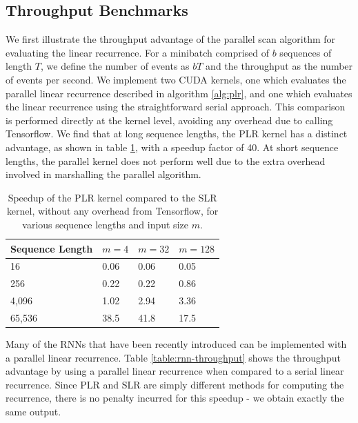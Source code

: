 \documentclass{article}
\begin{document}
\subsection{Throughput Benchmarks}
We first illustrate the throughput advantage of the parallel scan algorithm for
evaluating the linear recurrence. For a minibatch comprised of \(b\) sequences
of length \(T\), we define the number of events as \(bT\) and the throughput as
the number of events per second. We implement two CUDA kernels, one which
evaluates the parallel linear recurrence described in algorithm \ref{alg:plr},
and one which evaluates the linear recurrence using the straightforward serial
approach. This comparison is performed directly at the kernel level, avoiding
any overhead due to calling Tensorflow. We find that at long sequence lengths,
the PLR kernel has a distinct advantage, as shown in table
\ref{table:kernel-throughput}, with a speedup factor of 40. At short sequence
lengths, the parallel kernel does not perform well due to the extra overhead
involved in marshalling the parallel algorithm. 
\begin{table}[]
  \centering
\caption{Speedup of the PLR kernel compared to the SLR kernel, without any
  overhead from Tensorflow, for various sequence lengths and input size \(m\).}      
\label{table:kernel-throughput}
\begin{tabular}{@{}llll@{}}
Sequence Length & \(m=4\)  & \(m=32\) & \(m=128\) \\ \midrule
16              & 0.06 & 0.06 & 0.05  \\
256             & 0.22 & 0.22 & 0.86  \\
4,096           & 1.02 & 2.94 & 3.36  \\
65,536          & 38.5 & 41.8 & 17.5  \\ \bottomrule
\end{tabular}
\end{table}
  
Many of the RNNs that have been recently introduced can be implemented with a
parallel linear recurrence. Table \ref{table:rnn-throughput} shows the
throughput advantage by using a parallel linear recurrence when compared to a
serial linear recurrence. Since PLR and SLR are simply different methods for
computing the recurrence, there is no penalty incurred for this speedup - we
obtain exactly the same output.
\end{document}
